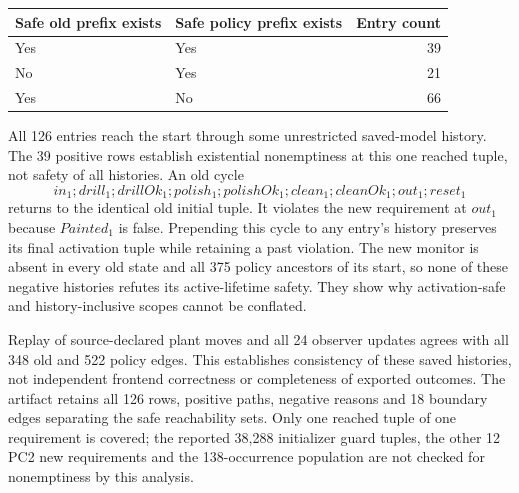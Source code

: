 \begin{center}\small
\begin{tabular}{@{}llr@{}}\toprule
Safe old prefix exists & Safe policy prefix exists & Entry count\\\midrule
Yes & Yes & 39\\
No & Yes & 21\\
Yes & No & 66\\\bottomrule
\end{tabular}
\end{center}
All 126 entries reach the start through some unrestricted saved-model history. The 39 positive rows establish existential nonemptiness at this one reached tuple, not safety of all histories. An old cycle
\[
in_1;drill_1;drillOk_1;polish_1;polishOk_1;clean_1;cleanOk_1;out_1;reset_1
\]
returns to the identical old initial tuple. It violates the new requirement at $out_1$ because $Painted_1$ is false. Prepending this cycle to any entry's history preserves its final activation tuple while retaining a past violation. The new monitor is absent in every old state and all 375 policy ancestors of its start, so none of these negative histories refutes its active-lifetime safety. They show why activation-safe and history-inclusive scopes cannot be conflated.

Replay of source-declared plant moves and all 24 observer updates agrees with all 348 old and 522 policy edges. This establishes consistency of these saved histories, not independent frontend correctness or completeness of exported outcomes. The artifact retains all 126 rows, positive paths, negative reasons and 18 boundary edges separating the safe reachability sets. Only one reached tuple of one requirement is covered; the reported 38,288 initializer guard tuples, the other 12 PC2 new requirements and the 138-occurrence population are not checked for nonemptiness by this analysis.


